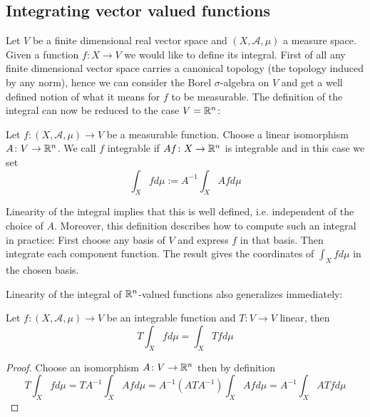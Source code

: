 \subsection{Integrating vector valued functions}
\label{subsec:integrating_vector_valued_functions}

Let $V$ be a finite dimensional real vector space and $(X,\mathcal{A},\mu)$ a measure space. Given a function $f \colon X \to V$ we would like to define its integral. First of all any finite dimensional vector space carries a canonical topology (the topology induced by any norm), hence we can consider the Borel $\sigma$-algebra on $V$ and get a well defined notion of what it means for $f$ to be measurable. The definition of the integral can now be reduced to the case $V = \mathbb{R}^n$: 

\begin{definition}
    Let $f\colon (X,\mathcal{A},\mu) \to V$ be a measurable function. Choose a linear isomorphism $A \colon V \to \mathbb{R}^n$. We call $f$ integrable if $Af \colon X \to \mathbb{R}^n$ is integrable and in this case we set 
    \[
    \int_{X} f d\mu := A^{-1} \int_X Af d\mu
    \]
\end{definition}

Linearity of the integral implies that this is well defined, i.e. independent of the choice of $A$. Moreover, this definition describes how to compute such an integral in practice: First choose any basis of $V$ and express $f$ in that basis. Then integrate each component function. The result gives the coordinates of $\int_{X} f d\mu$ in the chosen basis.

Linearity of the integral of $\mathbb{R}^n$-valued functions also generalizes immediately:

\begin{lemma}
    \label{lem:linearity_of_integral}
    Let $f\colon (X,\mathcal{A},\mu) \to V$ be an integrable function and $T \colon V \to V$ linear, then 
    \[
    T\int_{X} f d\mu  = \int_{X} Tf d\mu 
    \]
\end{lemma}
\begin{proof}
    Choose an isomorphism $A \colon V \to \mathbb{R}^n$ then by definition
    \[
        T\int_{X} f d\mu = TA^{-1}\int_{X} Af d\mu = A^{-1}(ATA^{-1})\int_{X} Af d\mu = A^{-1} \int_{X} AT f d\mu
    \]
\end{proof}
